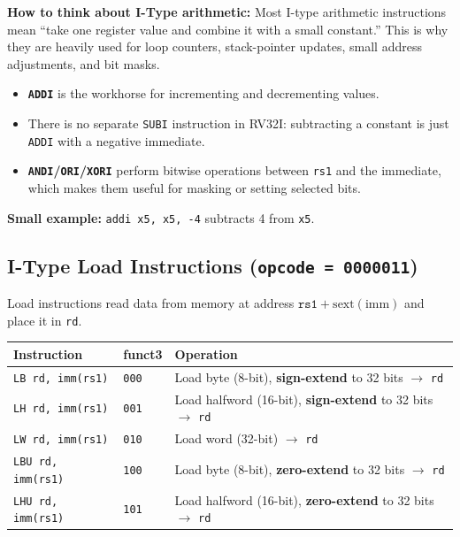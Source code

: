 \documentclass[12pt, a4paper, oneside]{book}
\begin{document}
\begin{keybox}
\textbf{\color{gold}How to think about I-Type arithmetic:}
Most I-type arithmetic instructions mean ``take one register value and combine it with a small constant.'' This is why they are heavily used for loop counters, stack-pointer updates, small address adjustments, and bit masks.

\begin{itemize}
  \item \textbf{\texttt{ADDI}} is the workhorse for incrementing and decrementing values.
  \item There is no separate \texttt{SUBI} instruction in RV32I: subtracting a constant is just \texttt{ADDI} with a negative immediate.
  \item \textbf{\texttt{ANDI}/\texttt{ORI}/\texttt{XORI}} perform bitwise operations between \texttt{rs1} and the immediate, which makes them useful for masking or setting selected bits.
\end{itemize}

\textbf{Small example:} \texttt{addi x5, x5, -4} subtracts 4 from \texttt{x5}.
\end{keybox}

\subsection{I-Type Load Instructions (\texttt{opcode = 0000011})}

Load instructions read data from memory at address $\texttt{rs1} + \text{sext}(\text{imm})$ and place it in \texttt{rd}.

\begin{center}
\renewcommand{\arraystretch}{1.25}
\begin{tabular}{l l p{8cm}}
\toprule
\textbf{\color{purple}Instruction} & \textbf{\color{purple}funct3} & \textbf{\color{purple}Operation} \\
\midrule
\texttt{LB  rd, imm(rs1)}  & \texttt{000} & Load byte (8-bit), \textbf{sign-extend} to 32 bits $\rightarrow$ \texttt{rd} \\
\texttt{LH  rd, imm(rs1)}  & \texttt{001} & Load halfword (16-bit), \textbf{sign-extend} to 32 bits $\rightarrow$ \texttt{rd} \\
\texttt{LW  rd, imm(rs1)}  & \texttt{010} & Load word (32-bit) $\rightarrow$ \texttt{rd} \\
\texttt{LBU rd, imm(rs1)}  & \texttt{100} & Load byte (8-bit), \textbf{zero-extend} to 32 bits $\rightarrow$ \texttt{rd} \\
\texttt{LHU rd, imm(rs1)}  & \texttt{101} & Load halfword (16-bit), \textbf{zero-extend} to 32 bits $\rightarrow$ \texttt{rd} \\
\bottomrule
\end{tabular}
\end{center}
\end{document}

